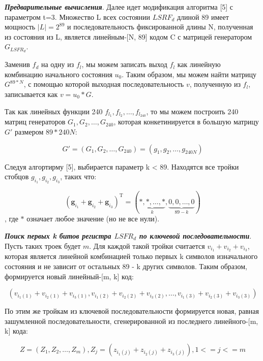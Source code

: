 \documentclass[colorthm]{./civarticle}
\begin{document}
\textbf{\emph{Предварительные вычисления}}. Далее идет модификация алгоритма [5] с параметром t=3. Множество L всех состоянии $LSRF_d$ длиной 89 имеет мощность $|L|=2^{89}$ и последовательность фиксированной длины N, полученная из состояния из L, является линейным-[N, 89] кодом C с матрицей генератором $G_{LSFR_d}$.

Заменив $f_d$ на одну из $f_l$, мы можем записать выход $f_l$ как линейную комбинацию начального состояния $u_0$. Таким образом, мы можем найти матрицу $G^{89*N}$, с помощью которой выходная последовательность $v$, полученную из $f_l$, записывается как $v = u_0 * G$.

Так как линейных функции 240 $f_{l_1}, f_{l_2}, \dots, f_{l_240}$, то мы можем построить 240 матриц генераторов
$G_1, G_2, \dots, G_{240}$, которая конкетинируется в большую матрицу $G'$ размером $89*240N$:

\begin{equation}
    G' = (G_1, G_2, \dots, G_240) = (g_1, g_2, \dots, g_{240N})
\end{equation}

Следуя алгортирму [5], выбирается параметр k < 89. Находятся все тройки стобцов $g_{i_1}, g_{i_2}, g_{i_3}$, таких что:

\begin{equation}
\left(\boldsymbol{g}_{i_1}+\boldsymbol{g}_{i_2}+\boldsymbol{g}_{i_3}\right)^{\mathrm{T}}=(\underbrace{*, *, \ldots, *}_k, \underbrace{0,0, \ldots, 0}_{89-k})
\end{equation}, где $*$ означает любое значение (но не все нули).

\textbf{\emph{Поиск первых k битов регистра $LSFR_d$ по ключевой последовательности}}. Пусть таких троек будет $m$. Для каждой такой тройки считается $v_{i_1} + v_{i_2} + v_{i_3}$, которая является линейной комбинацией только первых k символов изначального состояния и не зависит от остальных 89 - k других символов. Таким образом, формируется новый линейный-[m, k] код: 

\begin{equation}
    (v_{i_1(1)} + v_{i_2(1)} + v_{i_3(1)}, v_{i_1(2)} + v_{i_2(2)} + v_{i_3(2)}, \dots, v_{i_1(3)} + v_{i_2(3)} + v_{i_3(3)})
\end{equation}

По этим же тройкам из ключевой последовательности формируется новая, равная зашумленной последовательности, сгенерированной из последнего линейного-[m, k] кода:

\begin{equation}
    Z = (Z_1, Z_2, \dots, Z_m), Z_j = (z_{i_1(j)} + z_{i_2(j)} + z_{i_3(j)}), 1 <= j <= m
\end{equation}
\end{document}

